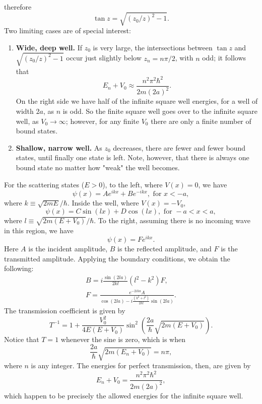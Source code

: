 \documentclass{article}
\begin{document}
therefore \[
  \tan z = \sqrt{(z_0/z)^2 - 1}.
\] Two limiting cases are of special interest:
\begin{enumerate}
  \item \textbf{Wide, deep well.} If $z_0$ is very large, the intersections
    between $\tan z$ and $\sqrt{(z_0/z)^2 - 1}$ occur just slightly below $z_n
    = n\pi/2$, with $n$ odd; it follows that \[
      E_n + V_0 \approx \frac{n^2\pi^2\hbar^2}{2m(2a)^2}.
    \] On the right side we have half of the infinite square well energies,
    for a well of width $2a$, as $n$ is odd. So the finite square well goes
    over to the infinite square well, as $V_0 \to \infty$; however, for any
    finite $V_0$ there are only a finite number of bound states.
  \item \textbf{Shallow, narrow well.} As $z_0$ decreases, there are fewer and
    fewer bound states, until finally one state is left. Note, however, that
    there is always one bound state no matter how "weak" the well becomes.
\end{enumerate}

For the scattering states ($E > 0$), to the left, where $V(x) = 0$, we have \[
  \psi(x) = Ae^{ikx} + Be^{-ikx}, \text{ for } x < -a,
\] where $k \equiv \sqrt{2mE}/\hbar$. Inside the well, where $V(x) = -V_0$, \[
  \psi(x) = C\sin(lx) + D\cos(lx), \text{ for } -a < x < a,
\] where $l \equiv \sqrt{2m(E + V_0)}/\hbar$. To the right, assuming there is
no incoming wave in this region, we have \[
  \psi(x) = Fe^{ikx}.
\] Here $A$ is the incident amplitude, $B$ is the reflected amplitude, and $F$
is the transmitted amplitude. Applying the boundary conditions, we obtain the
following:
\begin{equation} \label{eq:fin-sq-well-sca-1}
  \begin{gathered}
    B = i\frac{\sin(2la)}{2kl}(l^2 - k^2)F, \\
    F = \frac{e^{-2ika}A}{\cos(2la) - i\frac{(k^2 + l^2)}{2kl}\sin(2la)}.
  \end{gathered}
\end{equation}
The transmission coefficient is given by
\begin{equation} \label{eq:fin-sq-well-sca-tran}
  T^{-1} = 1 + \frac{V_0^2}{4E(E + V_0)}\sin^2\left(
    \frac{2a}{\hbar}\sqrt{2m(E + V_0)}
  \right).
\end{equation}
Notice that $T = 1$ whenever the sine is zero, which is when \[
  \frac{2a}{\hbar}\sqrt{2m(E_n + V_0)} = n\pi,
\] where $n$ is any integer. The energies for perfect transmission, then, are
given by \[
  E_n + V_0 = \frac{n^2\pi^2\hbar^2}{2m(2a)^2},
\] which happen to be precisely the allowed energies for the infinite square
well.
\end{document}
